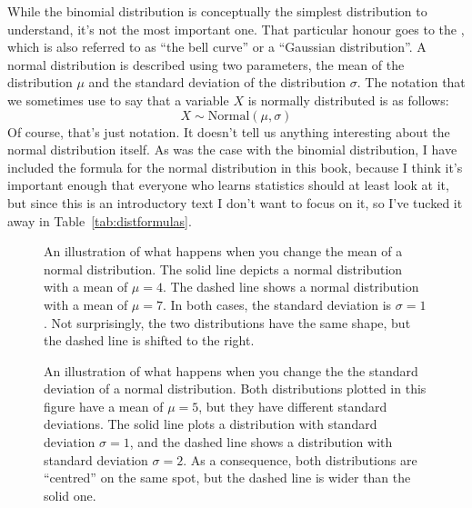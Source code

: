 While the binomial distribution is conceptually the simplest distribution to understand, it's not the most important one. That particular honour goes to the , which is also referred to as ``the bell curve'' or a ``Gaussian distribution''. A normal distribution is described using two parameters, the mean of the distribution $\mu$ and the standard deviation of the distribution $\sigma$. The notation that we sometimes use to say that a variable $X$ is normally distributed is as follows:
$$
X \sim \mbox{Normal}(\mu,\sigma)
$$
Of course, that's just notation. It doesn't tell us anything interesting about the normal distribution itself. As was the case with the binomial distribution, I have included the formula for the normal distribution in this book, because I think it's important enough that everyone who learns statistics should at least look at it, but since this is an introductory text I don't want to focus on it, so I've tucked it away in Table~\ref{tab:distformulas}. 


\begin{figure}[t]
\begin{center}
\caption{An illustration of what happens when you change the mean of a normal distribution. The solid line depicts a normal distribution with a mean of $\mu=4$. The dashed line shows a normal distribution with a mean of $\mu=7$. In both cases, the standard deviation is $\sigma=1$. Not surprisingly, the two distributions have the same shape, but the dashed line is shifted to the right.}
\label{fig:normmean}
\HR
\end{center}
\end{figure}



\begin{figure}[t]
\begin{center}
\caption{An illustration of what happens when you change the the standard deviation of a normal distribution. Both distributions plotted in this figure have a mean of $\mu = 5$, but they have different standard deviations. The solid line plots a distribution with standard deviation $\sigma=1$, and the dashed line shows a distribution with standard deviation $\sigma = 2$. As a consequence, both distributions are ``centred'' on the same spot, but the dashed line is wider than the solid one.}
\label{fig:normsd}
\HR
\end{center}
\end{figure}

